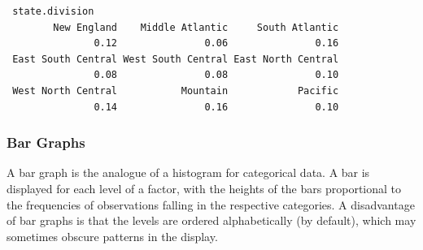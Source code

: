 \documentclass[captions=tableheading]{scrbook}
\begin{document}
\begin{verbatim}
 state.division
        New England    Middle Atlantic     South Atlantic 
               0.12               0.06               0.16 
 East South Central West South Central East North Central 
               0.08               0.08               0.10 
 West North Central           Mountain            Pacific 
               0.14               0.16               0.10
\end{verbatim}
\subsubsection{Bar Graphs}
\label{sec-3-1-4-2}
\label{par:Bar-Graphs}


A bar graph is the analogue of a histogram for categorical data. A bar is displayed for each level of a factor, with the heights of the bars proportional to the frequencies of observations falling in the respective categories. A disadvantage of bar graphs is that the levels are ordered alphabetically (by default), which may sometimes obscure patterns in the display. 
\end{document}
